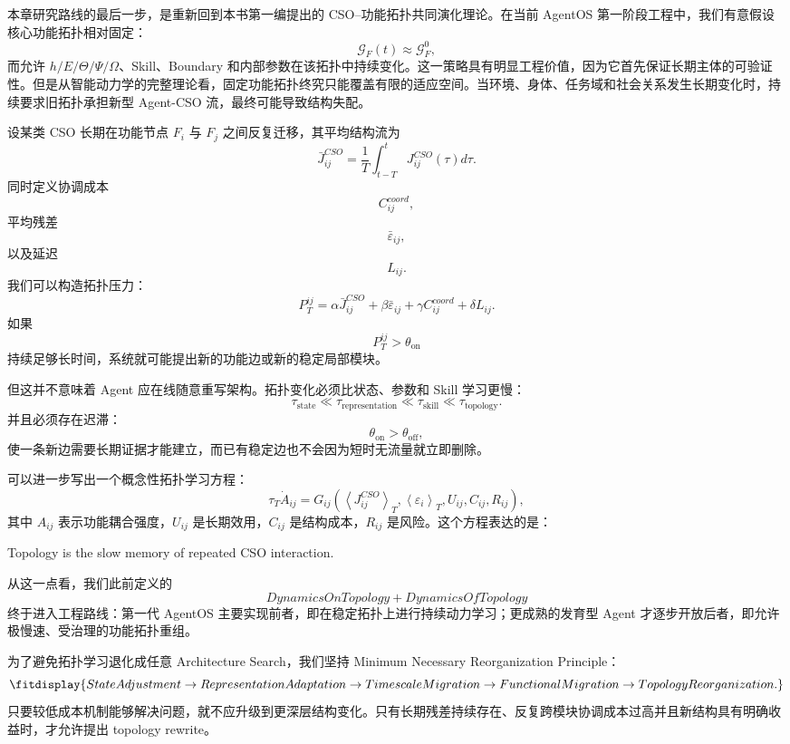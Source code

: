 本章研究路线的最后一步，是重新回到本书第一编提出的 CSO--功能拓扑共同演化理论。在当前 AgentOS 第一阶段工程中，我们有意假设核心功能拓扑相对固定：
\[
\mathcal G_F(t)
\approx
\mathcal G_F^0,
\]
而允许 $h/E/\Theta/\Psi/\Omega$、Skill、Boundary 和内部参数在该拓扑中持续变化。这一策略具有明显工程价值，因为它首先保证长期主体的可验证性。但是从智能动力学的完整理论看，固定功能拓扑终究只能覆盖有限的适应空间。当环境、身体、任务域和社会关系发生长期变化时，持续要求旧拓扑承担新型 Agent-CSO 流，最终可能导致结构失配。

设某类 CSO 长期在功能节点 $F_i$ 与 $F_j$ 之间反复迁移，其平均结构流为
\[
\bar J_{ij}^{CSO}
=
\frac{1}{T}
\int_{t-T}^{t}
J_{ij}^{CSO}(\tau)d\tau.
\]
同时定义协调成本
\[
C_{ij}^{coord},
\]
平均残差
\[
\bar\varepsilon_{ij},
\]
以及延迟
\[
L_{ij}.
\]
我们可以构造拓扑压力：
\[
P_T^{ij}
=
\alpha
\bar J_{ij}^{CSO}
+
\beta
\bar\varepsilon_{ij}
+
\gamma
C_{ij}^{coord}
+
\delta
L_{ij}.
\]
如果
\[
P_T^{ij}
>
\theta_{\mathrm{on}}
\]
持续足够长时间，系统就可能提出新的功能边或新的稳定局部模块。

但这并不意味着 Agent 应在线随意重写架构。拓扑变化必须比状态、参数和 Skill 学习更慢：
\[
\tau_{\mathrm{state}}
\ll
\tau_{\mathrm{representation}}
\ll
\tau_{\mathrm{skill}}
\ll
\tau_{\mathrm{topology}}.
\]
并且必须存在迟滞：
\[
\theta_{\mathrm{on}}
>
\theta_{\mathrm{off}},
\]
使一条新边需要长期证据才能建立，而已有稳定边也不会因为短时无流量就立即删除。

可以进一步写出一个概念性拓扑学习方程：
\[
\tau_T\dot A_{ij}
=
G_{ij}
\left(
\left\langle
J_{ij}^{CSO}
\right\rangle_T,
\left\langle
\varepsilon_i
\right\rangle_T,
U_{ij},
C_{ij},
R_{ij}
\right),
\]
其中 $A_{ij}$ 表示功能耦合强度，$U_{ij}$ 是长期效用，$C_{ij}$ 是结构成本，$R_{ij}$ 是风险。这个方程表达的是：
\begin{statementbox}
Topology is the slow memory of repeated CSO interaction.
\end{statementbox}

从这一点看，我们此前定义的
\[
\boxed{
DynamicsOnTopology
+
DynamicsOfTopology
}
\]
终于进入工程路线：第一代 AgentOS 主要实现前者，即在稳定拓扑上进行持续动力学习；更成熟的发育型 Agent 才逐步开放后者，即允许极慢速、受治理的功能拓扑重组。

为了避免拓扑学习退化成任意 Architecture Search，我们坚持 Minimum Necessary Reorganization Principle：
\[
\fitdisplay{
StateAdjustment
\rightarrow
RepresentationAdaptation
\rightarrow
TimescaleMigration
\rightarrow
FunctionalMigration
\rightarrow
TopologyReorganization.
}
\]
只要较低成本机制能够解决问题，就不应升级到更深层结构变化。只有长期残差持续存在、反复跨模块协调成本过高并且新结构具有明确收益时，才允许提出 topology rewrite。

